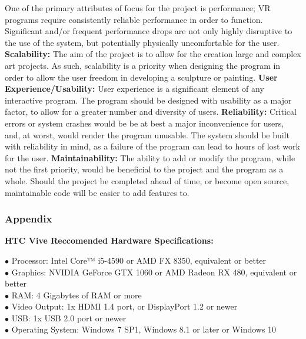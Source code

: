 \documentclass[onecolumn, draftclsnofoot,10pt, compsoc]{IEEEtran}
\begin{document}
One of the primary attributes of focus for the project is performance; VR programs require consistently reliable performance in order to function.
Significant and/or frequent performance drops are not only highly disruptive to the use of the system, but potentially physically uncomfortable for the user.
\newline
\textbf{Scalability:}
\newline
The aim of the project is to allow for the creation large and complex art projects.
As such, scalability is a priority when designing the program in order to allow the user freedom in developing a sculpture or painting.
\newline
\textbf{User Experience/Usability:}
\newline
User experience is a significant element of any interactive program.
The program should be designed with usability as a major factor, to allow for a greater number and diversity of users.
\newline
\textbf{Reliability:}
\newline
Critical errors or system crashes would be be at best a major inconvenience for users, and, at worst, would render the program unusable.
The system should be built with reliability in mind, as a failure of the program can lead to hours of lost work for the user.
\newline
\textbf{Maintainability:}
\newline
The ability to add or modify the program, while not the first priority, would be beneficial to the project and the program as a whole.
Should the project be completed ahead of time, or become open source, maintainable code will be easier to add features to.
\subsubsection{Appendix}
\textbf{HTC Vive Reccomended Hardware Specifications:}
\begin{description}
 \item[$\bullet$  Processor: Intel Core™ i5-4590 or AMD FX 8350, equivalent or better]
 \item[$\bullet$  Graphics: NVIDIA GeForce GTX 1060 or AMD Radeon RX 480, equivalent or better]
 \item[$\bullet$  RAM: 4 Gigabytes of RAM or more]
\item[$\bullet$  Video Output: 1x HDMI 1.4 port, or DisplayPort 1.2 or newer]
\item[$\bullet$  USB: 1x USB 2.0 port or newer]
\item[$\bullet$  Operating System: Windows 7 SP1, Windows 8.1 or later or Windows 10]
\end{description}
\cite{vive}
\end{document}
